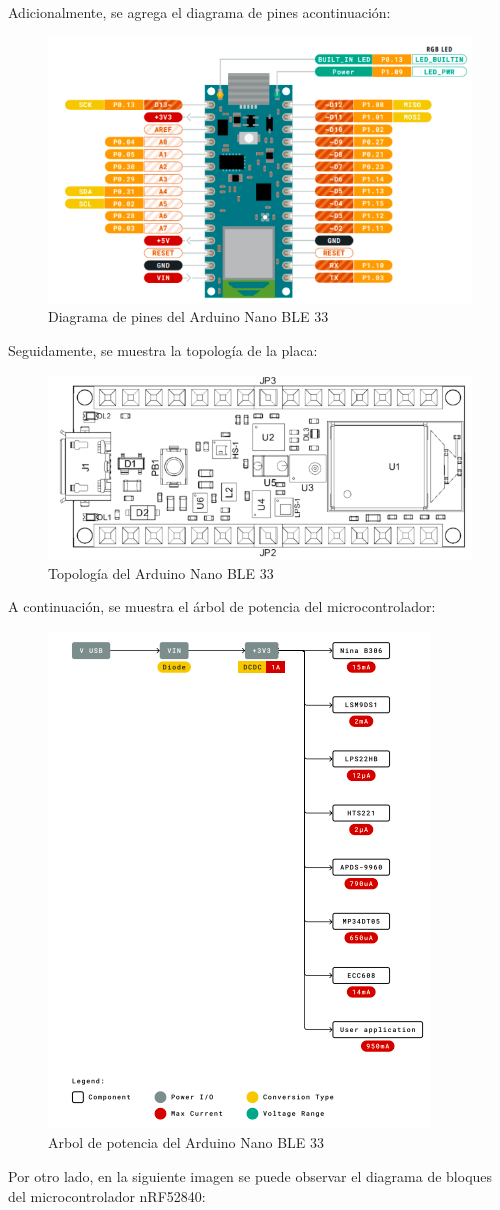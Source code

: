 \documentclass[12pt,a4paper]{article}
\begin{document}
Adicionalmente, se agrega el diagrama de pines acontinuación:  
\begin{figure}[H]
    \centering
    \includegraphics[width=0.6\linewidth]{Imagenes/pines.png}
    \caption{Diagrama de pines del Arduino Nano BLE 33 \cite{hoja}}
    \label{fig:1}
\end{figure}
Seguidamente, se muestra la topología de la placa:
\begin{figure}[H]
    \centering
    \includegraphics[width=0.6\linewidth]{Imagenes/topologia.png}
    \caption{Topología del Arduino Nano BLE 33 \cite{hoja}}
    \label{fig:2}
\end{figure}

A continuación, se muestra el árbol de potencia del microcontrolador:
\begin{figure}[H]
    \centering
    \includegraphics[width=0.3\linewidth]{Imagenes/V_tree.png}
    \caption{Arbol de potencia del Arduino Nano BLE 33 \cite{hoja}}
    \label{fig:3}
\end{figure}

Por otro lado, en la siguiente imagen se puede observar el diagrama de bloques del microcontrolador nRF52840:
\end{document}
